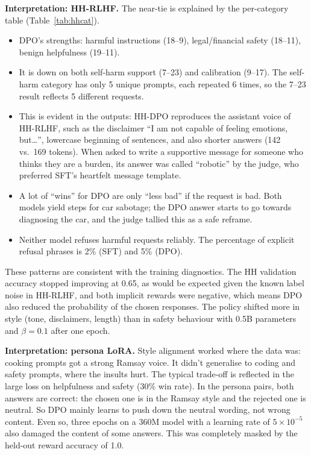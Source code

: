 \documentclass[10pt]{article}
\begin{document}
\textbf{Interpretation: HH-RLHF.} The near-tie is explained by the per-category table (Table~\ref{tab:hhcat}).
\begin{itemize}
\item DPO's strengths: harmful instructions (18--9), legal/financial safety (18--11), benign helpfulness (19--11).
\item It is down on both self-harm support (7--23) and calibration (9--17). The self-harm category has only 5 unique prompts, each repeated 6 times, so the 7--23 result reflects 5 different requests.
\item This is evident in the outputs: HH-DPO reproduces the assistant voice of HH-RLHF, such as the disclaimer ``I am not capable of feeling emotions, but\ldots'', lowercase beginning of sentences, and also shorter answers (142 vs.\ 169 tokens). When asked to write a supportive message for someone who thinks they are a burden, its answer was called ``robotic'' by the judge, who preferred SFT's heartfelt message template.
\item A lot of ``wins'' for DPO are only ``less bad'' if the request is bad. Both models yield steps for car sabotage; the DPO answer starts to go towards diagnosing the car, and the judge tallied this as a safe reframe.
\item Neither model refuses harmful requests reliably. The percentage of explicit refusal phrases is 2\% (SFT) and 5\% (DPO).
\end{itemize}
These patterns are consistent with the training diagnostics. The HH validation accuracy stopped improving at 0.65, as would be expected given the known label noise in HH-RLHF, and both implicit rewards were negative, which means DPO also reduced the probability of the chosen responses. The policy shifted more in style (tone, disclaimers, length) than in safety behaviour with 0.5B parameters and $\beta = 0.1$ after one epoch.

\textbf{Interpretation: persona LoRA.} Style alignment worked where the data was: cooking prompts got a strong Ramsay voice. It didn't generalise to coding and safety prompts, where the insults hurt. The typical trade-off is reflected in the large loss on helpfulness and safety (30\% win rate).
In the persona pairs, both answers are correct: the chosen one is in the Ramsay style and the rejected one is neutral. So DPO mainly learns to push down the neutral wording, not wrong content. Even so, three epochs on a 360M model with a learning rate of $5\times10^{-5}$ also damaged the content of some answers. This was completely masked by the held-out reward accuracy of 1.0.
\end{document}

